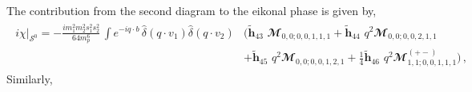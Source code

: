 The contribution from the second diagram to the eikonal phase is given by,
\begin{align}
    \begin{split}
i\chi\Big|_{\mathcal{S}^0}=-\frac{i m_1^2 m_2^2 s_1^2 s_2^2}{64 m_p^6}\,\int e^{-i q \cdot b}\, \hat\delta(q\cdot v_1)\hat\delta(q\cdot v_2)&\Big(\boldsymbol{\tilde h}_{43}\,\,\mathbfcal{M}_{0,0;0,0,1,1,1}+\boldsymbol{\tilde h}_{44}\,\,q^2\mathbfcal{M}_{0,0;0,0,2,1,1}\\&+\boldsymbol{\tilde h}_{45}\,\,q^2\mathbfcal{M}_{0,0;0,0,1,2,1}+\frac{1}{4}\boldsymbol{\tilde h}_{46}\,\,q^2\mathbfcal{M}^{(+-)}_{1,1;0,0,1,1,1}\Big)\,,
   \end{split}
\end{align}
Similarly,
